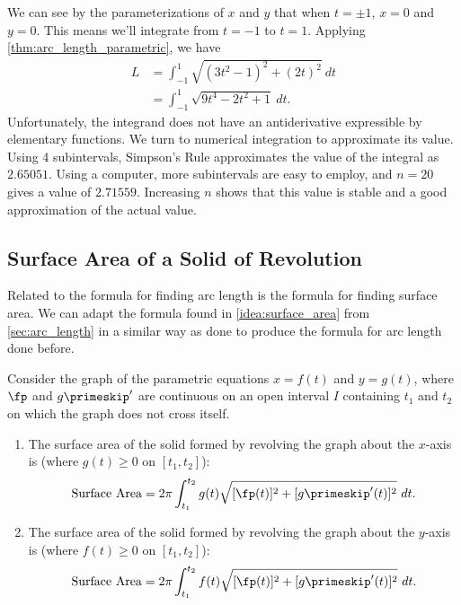 {We can see by the parameterizations of $x$ and $y$ that when $t=\pm 1$, $x=0$ and $y=0$. This means we'll integrate from $t=-1$ to $t=1$. Applying \autoref{thm:arc_length_parametric}, we have
\begin{align*}
L 	&= \int_{-1}^1\sqrt{(3t^2-1)^2+(2t)^2}\ dt\\
		&=	\int_{-1}^1 \sqrt{9t^4-2t^2+1} \ dt.
\end{align*}
Unfortunately, the integrand does not have an antiderivative expressible by elementary functions. We turn to numerical integration to approximate its value. Using 4 subintervals, Simpson's Rule approximates the value of the integral as $2.65051$. Using a computer, more subintervals are easy to employ, and $n=20$ gives a value of $2.71559$. Increasing $n$ shows that this value is stable and a good approximation of the actual value.}


\subsection*{Surface Area of a Solid of Revolution}

Related to the formula for finding arc length is the formula for finding surface area. We can adapt the formula found in \autoref{idea:surface_area} from \autoref{sec:arc_length} in a similar way as done to produce the formula for arc length done before.

{Consider the graph of the parametric equations $x=f(t)$ and $y=g(t)$, where $\fp$ and $g\primeskip'$ are continuous on an open interval $I$ containing $t_1$ and $t_2$ on which the graph does not cross itself.
\begin{enumerate}
	\item	The surface area of the solid formed by revolving the graph about the $x$-axis is (where $g(t)\geq0$ on $[t_1,t_2]$):
	$$\text{Surface Area} = 2\pi\int_{t_1}^{t_2} g(t)\sqrt{[\fp(t)]^2+[g\primeskip'(t)]^2}\ dt.$$
	
	\item	The surface area of the solid formed by revolving the graph about the $y$-axis is (where $f(t)\geq0$ on $[t_1,t_2]$):
	$$\text{Surface Area} = 2\pi\int_{t_1}^{t_2} f(t)\sqrt{[\fp(t)]^2+[g\primeskip'(t)]^2}\ dt.$$
	\end{enumerate}}

